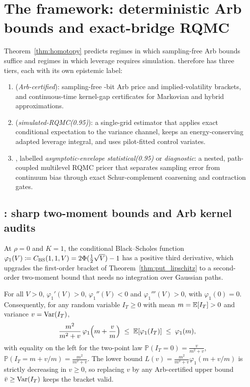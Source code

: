 \section{The \RoughCertSPX{} framework: deterministic Arb bounds and exact-bridge RQMC}
\label{sec:framework}

Theorem~\ref{thm:homotopy} predicts regimes in which sampling-free Arb bounds suffice and regimes in which leverage requires simulation. \RoughCertSPX{} therefore has three tiers, each with its own epistemic label:
\begin{enumerate}[1.]
  \item \RCDet{} (\emph{Arb-certified}): sampling-free \ArbBits-bit Arb price and implied-volatility brackets, and continuous-time kernel-gap certificates for Markovian and hybrid approximations.
  \item \RCCE{} (\emph{simulated-RQMC(0.95)}): a single-grid estimator that applies exact conditional expectation to the variance channel, keeps an energy-conserving adapted leverage integral, and uses pilot-fitted control variates.
  \item \RCBridge{}, labelled \emph{asymptotic-envelope statistical(0.95)} or \emph{diagnostic}: a nested, path-coupled multilevel RQMC pricer that separates sampling error from continuum bias through exact Schur-complement coarsening and contraction gates.
\end{enumerate}

\subsection{\RCDet{}: sharp two-moment bounds and Arb kernel audits}
\label{sec:det}

At $\rho=0$ and $K=1$, the conditional Black--Scholes function $\varphi_1(V)\coloneqq C_{\mathrm{BS}}(1,1,V)=2\Phi(\tfrac12\sqrt{V})-1$ has a positive third derivative, which upgrades the first-order bracket of Theorem~\ref{thm:put_lipschitz} to a second-order two-moment bound that needs no integration over Gaussian paths.

\begin{proposition}[Sharp two-moment ATM bound for $\rho=0$]
\label{prop:twomoment}
For all $V>0$, $\varphi_1'(V)>0$, $\varphi_1''(V)<0$ and $\varphi_1'''(V)>0$, with $\varphi_1(0)=0$. Consequently, for any random variable $I_T\ge 0$ with mean $m=\mathbb{E}[I_T]>0$ and variance $v=\operatorname{Var}(I_T)$,
\begin{equation}
  \frac{m^2}{m^2+v}\,\varphi_1\!\left(m + \frac{v}{m}\right)
  \;\le\; \mathbb{E}\!\left[\varphi_1(I_T)\right]
  \;\le\; \varphi_1(m),
  \label{eq:twomoment}
\end{equation}
with equality on the left for the two-point law $\mathbb{P}(I_T=0)=\frac{v}{m^2+v}$, $\mathbb{P}(I_T=m+v/m)=\frac{m^2}{m^2+v}$. The lower bound $L(v)=\frac{m^2}{m^2+v}\varphi_1(m+v/m)$ is strictly decreasing in $v\ge 0$, so replacing $v$ by any Arb-certified upper bound $\bar{v}\ge\operatorname{Var}(I_T)$ keeps the bracket valid.
\end{proposition}

